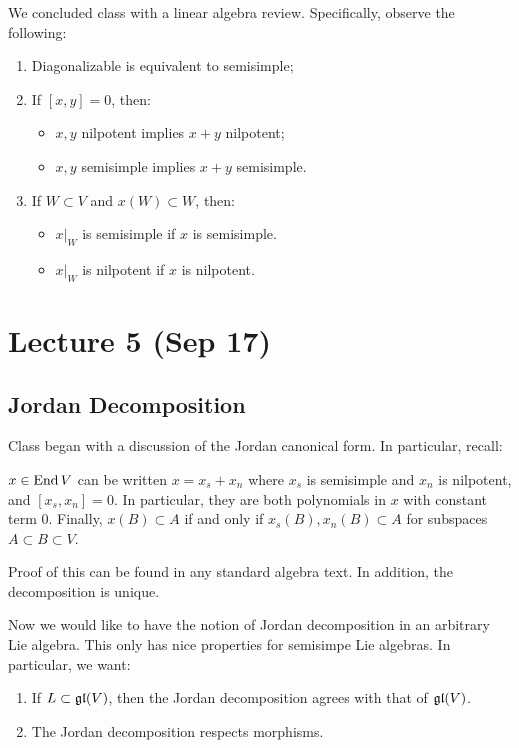 \documentclass[twoside, 10pt]{article}
\begin{document}
    We concluded class with a linear algebra review. Specifically, observe the
    following: \begin{enumerate} \item Diagonalizable is equivalent to
        semisimple; \item If $[x,y] = 0$, then: \begin{itemize} \item $x,y$
            nilpotent implies $x+y$ nilpotent; \item $x,y$ semisimple implies
        $x+y$ semisimple.  \end{itemize} \item If $W \subset V$ and $x(W)
        \subset W$, then: \begin{itemize} \item $x|_W$ is semisimple if $x$ is
            semisimple.  \item $x|_W$ is nilpotent if $x$ is nilpotent.
    \end{itemize} \end{enumerate}

    \section{Lecture 5 (Sep 17)}%

    \subsection{Jordan Decomposition}%
    
    
    Class began with a discussion of the Jordan canonical form. In particular,
    recall:

    \begin{prop} $x \in \operatorname{End} V$ can be written $x=x_s+x_n$ where $x_s$ is
        semisimple and $x_n$ is nilpotent, and $[x_s,x_n] = 0$. In particular,
        they are both polynomials in $x$ with constant term $0$. Finally, $x(B)
        \subset A$ if and only if $x_s(B), x_n(B) \subset A$ for subspaces $A
        \subset B \subset V$.  \end{prop}

    Proof of this can be found in any standard algebra text. In addition, the
    decomposition is unique.

    Now we would like to have the notion of Jordan decomposition in an
    arbitrary Lie algebra. This only has nice properties for semisimpe Lie
    algebras. In particular, we want: \begin{enumerate} \item If $L \subset
        \mathfrak{gl}(V)$, then the Jordan decomposition agrees with that of
        $\mathfrak{gl}(V)$.  \item The Jordan decomposition respects morphisms.
\end{enumerate}
    
\end{document}
